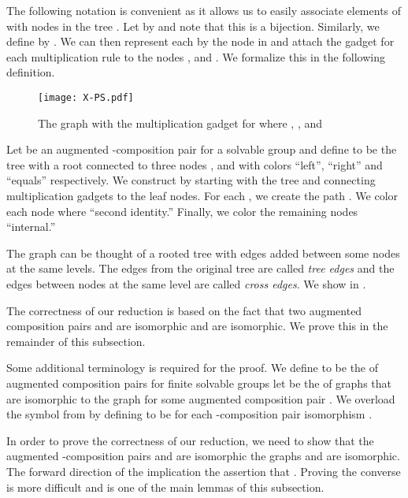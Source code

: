The following notation is convenient as it allows us to easily associate elements of  with nodes in the tree .  Let  by  and note that this is a bijection.  Similarly, we define  by .  We can then represent each  by the node  in  and attach the gadget for each multiplication rule  to the nodes ,  and .  We formalize this in the following definition.


\begin{figure}[H]
  \centering
  \texttt{[image: X-PS.pdf]}
  \caption{The graph  with the multiplication gadget for  where , ,  and }
  \label{fig:X-PS}
\end{figure}


\begin{definition}
  \label{defn:X-PS}
  Let  be an augmented -composition pair for a solvable group  and define  to be the tree with a root connected to three nodes ,  and  with colors ``left'', ``right'' and ``equals'' respectively.  We construct  by starting with the tree  and connecting multiplication gadgets to the leaf nodes.  For each , we create the path .  We color each node  where  ``second identity.''  Finally, we color the remaining nodes ``internal.''

\end{definition}

The graph  can be thought of a rooted tree with edges added between some nodes at the same levels.  The edges from the original tree are called \emph{tree edges} and the edges between nodes at the same level are called \emph{cross edges}.  We show  in .

The correctness of our reduction is based on the fact that two augmented composition pairs  and  are isomorphic \ifft  and  are isomorphic.  We prove this in the remainder of this subsection.

Some additional terminology is required for the proof.  We define  to be the \classorcat\spc of augmented composition pairs for finite solvable groups  let  be the \classorcat\spc of graphs that are isomorphic to the graph  for some augmented composition pair .  We overload the symbol  from  by defining  to be  for each -composition pair isomorphism .

In order to prove the correctness of our reduction, we need to show that the augmented -composition pairs  and  are isomorphic \ifft the graphs  and  are isomorphic.  The forward direction of the implication  the assertion that .  Proving the converse is more difficult and is one of the main lemmas of this subsection.



